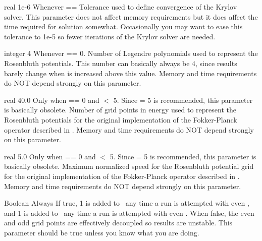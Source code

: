 \myhrule

{real}
{1e-6}
{Whenever  == \true}
{
Tolerance used to define convergence of the Krylov solver.
This parameter does not affect memory requirements but it does affect the
time required for solution somewhat.
Occasionally you may want to ease this tolerance to 1e-5 so fewer iterations of the Krylov solver are needed.
}

\myhrule

{integer}
{4}
{Whenever  == 0.}
{Number of Legendre polynomials used to represent the Rosenbluth
potentials. This number can basically always be 4,
since results barely change when  is increased above this value.
Memory and time requirements do NOT depend strongly on this parameter.
}

\myhrule

{real}
{40.0}
{Only when  == 0 and  $<$ 5.
Since  = 5 is recommended, this parameter is basically obsolete.}
{
Number of grid points in energy used to represent the Rosenbluth potentials
for the original implementation of the Fokker-Planck operator described in \cite{speedGrids}.
Memory and time requirements do NOT depend strongly on this parameter.}

\myhrule

{real}
{5.0}
{Only when  == 0 and  $<$ 5.
Since  = 5 is recommended, this parameter is basically obsolete.}
{
Maximum normalized speed for the Rosenbluth potential grid
for the original implementation of the Fokker-Planck operator described in \cite{speedGrids}.
Memory and time requirements do NOT depend strongly on this parameter.}

\myhrule

{Boolean}
{\true}
{Always}
{
If true, 1 is added to \Ntheta~any time a run is attempted with even \Ntheta,
and 1 is added to \Nzeta~any time a run is attempted with even \Nzeta.
When false, the even and odd grid points are effectively decoupled so results are unstable.
This parameter should be true unless you know what you are doing.
}














